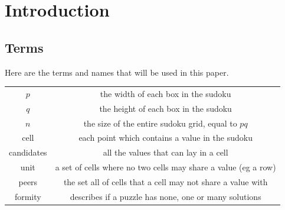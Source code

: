 
\section{Introduction}

    \subsection{Terms}
    Here are the terms and names that will be used in this paper.
    \begin{center}\begin{tabular}{c||c}
        \hline
        $p$         &   the width of each box in the sudoku                             \\
        $q$         &   the height of each box in the sudoku                            \\
        $n$         &   the size of the entire sudoku grid, equal to $pq$               \\
        cell        &   each point which contains a value in the sudoku                 \\
        candidates  &   all the values that can lay in a cell                           \\
        unit        &   a set of cells where no two cells may share a value (eg a row)  \\
        peers       &   the set all of cells that a cell may not share a value with     \\
        formity     &   describes if a puzzle has none, one or many solutions           \\
        \hline
    \end{tabular}\end{center}

